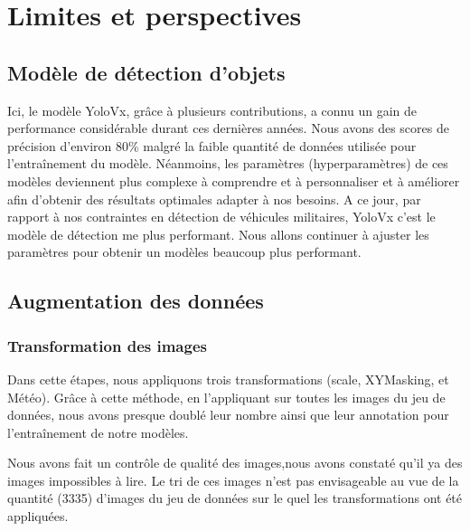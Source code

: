 \section{Limites et perspectives}
\subsection{Modèle de détection d'objets}
Ici, le modèle YoloVx, grâce à plusieurs contributions, a connu un gain de performance considérable durant ces dernières années.
Nous avons des scores de précision d'environ 80\% malgré la faible quantité de données utilisée pour l'entraînement du modèle.
Néanmoins, les paramètres (hyperparamètres) de ces modèles deviennent plus complexe à comprendre et à personnaliser et à améliorer afin d'obtenir des résultats optimales adapter à nos besoins.
A ce jour, par rapport à nos contraintes en détection de véhicules militaires, YoloVx c'est le modèle de détection me plus performant.
Nous allons continuer à ajuster les paramètres pour obtenir un modèles beaucoup plus performant.

\subsection{Augmentation des données}
\subsubsection{Transformation des images}
Dans cette étapes, nous appliquons trois transformations (scale, XYMasking, et Météo).
Grâce à cette méthode, en l'appliquant sur toutes les images du jeu de données, nous avons presque doublé leur nombre ainsi que leur annotation pour l'entraînement de notre modèles.

Nous avons fait un contrôle de qualité des images,nous avons constaté qu'il ya des images impossibles à lire.
Le tri de ces images n'est pas envisageable au vue de la quantité (3335) d'images du jeu de données sur le quel les transformations ont été appliquées.



